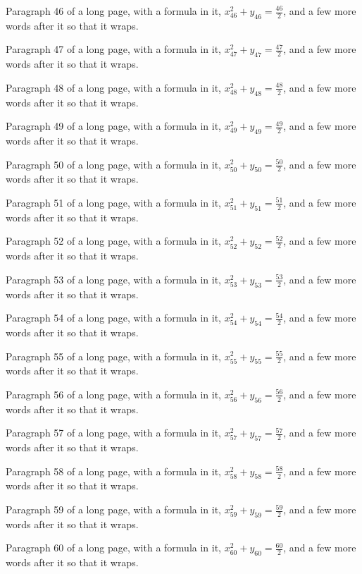 Paragraph 46 of a long page, with a formula in it, $x_{46}^2 + y_{46} = \frac{46}{2}$, and a few more words after it so that it wraps.

Paragraph 47 of a long page, with a formula in it, $x_{47}^2 + y_{47} = \frac{47}{2}$, and a few more words after it so that it wraps.

Paragraph 48 of a long page, with a formula in it, $x_{48}^2 + y_{48} = \frac{48}{2}$, and a few more words after it so that it wraps.

Paragraph 49 of a long page, with a formula in it, $x_{49}^2 + y_{49} = \frac{49}{2}$, and a few more words after it so that it wraps.

Paragraph 50 of a long page, with a formula in it, $x_{50}^2 + y_{50} = \frac{50}{2}$, and a few more words after it so that it wraps.

Paragraph 51 of a long page, with a formula in it, $x_{51}^2 + y_{51} = \frac{51}{2}$, and a few more words after it so that it wraps.

Paragraph 52 of a long page, with a formula in it, $x_{52}^2 + y_{52} = \frac{52}{2}$, and a few more words after it so that it wraps.

Paragraph 53 of a long page, with a formula in it, $x_{53}^2 + y_{53} = \frac{53}{2}$, and a few more words after it so that it wraps.

Paragraph 54 of a long page, with a formula in it, $x_{54}^2 + y_{54} = \frac{54}{2}$, and a few more words after it so that it wraps.

Paragraph 55 of a long page, with a formula in it, $x_{55}^2 + y_{55} = \frac{55}{2}$, and a few more words after it so that it wraps.

Paragraph 56 of a long page, with a formula in it, $x_{56}^2 + y_{56} = \frac{56}{2}$, and a few more words after it so that it wraps.

Paragraph 57 of a long page, with a formula in it, $x_{57}^2 + y_{57} = \frac{57}{2}$, and a few more words after it so that it wraps.

Paragraph 58 of a long page, with a formula in it, $x_{58}^2 + y_{58} = \frac{58}{2}$, and a few more words after it so that it wraps.

Paragraph 59 of a long page, with a formula in it, $x_{59}^2 + y_{59} = \frac{59}{2}$, and a few more words after it so that it wraps.

Paragraph 60 of a long page, with a formula in it, $x_{60}^2 + y_{60} = \frac{60}{2}$, and a few more words after it so that it wraps.



